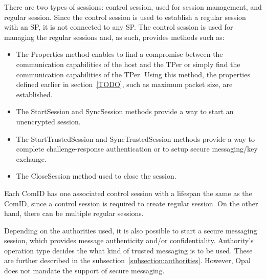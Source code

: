 There are two types of sessions: control session, used for session management, and regular session.
Since the control session is used to establish a regular session with an SP, it is not connected to any SP. The control session is used for managing the regular sessions and, as such, provides methods such as:
\begin{itemize}
\item The Properties method enables to find a compromise between the communication capabilities of the host and the TPer or simply find the communication capabilities of the TPer. Using this method, the properties defined earlier in section~\ref{TODO}, such as maximum packet size, are established.
\item The StartSession and SyncSession methods provide a way to start an unencrypted session.
\item The StartTrustedSession and SyncTrustedSession methods provide a way to complete challenge-response authentication or to setup secure messaging/key exchange.
\item The CloseSession method used to close the session.
\end{itemize}
Each ComID has one associated control session with a lifespan the same as the ComID, since a control session is required to create regular session. On the other hand, there can be multiple regular sessions.



Depending on the authorities used, it is also possible to start a secure messaging session, which provides message authenticity and/or confidentiality.
Authority's operation type decides the what kind of trusted messaging is to be used. These are further described in the subsection~\ref{subsection:authorities}. 
However, Opal does not mandate the support of secure messaging.



